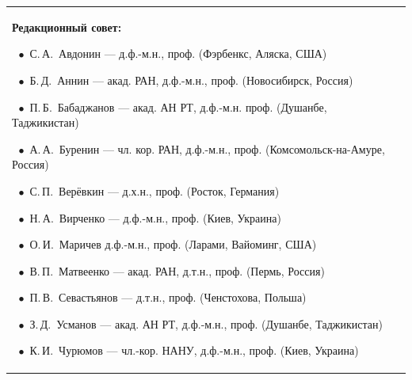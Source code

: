 \begin{table}[t!]
\begin{center}
\begin{tabular}{p{7cm}p{6cm}}
{%


\textbf{Редакционный совет:}
\par 

$~~\bullet$ С.\,А.~Авдонин --- д.ф.-м.н., проф. (Фэрбенкс, Аляска, США)  \par
$~~\bullet$ Б.\,Д.~Аннин --- акад. РАН, д.ф.-м.н., проф. (Новосибирск, Россия)\par
$~~\bullet$ П.\,Б.~Бабаджанов  --- акад. АН РТ, д.ф.-м.н. проф. (Душанбе, Таджикистан) \par
$~~\bullet$ А.\,А.~Буренин --- чл. кор. РАН, д.ф.-м.н., проф. (Комсомольск-на-Амуре, Россия)\par
$~~\bullet$ С.\,П.~Верёвкин  --- д.х.н., проф. (Росток, Германия) \par
$~~\bullet$ Н.\,А.~Вирченко --- д.ф.-м.н., проф. (Киев, Украина) \par
$~~\bullet$ О.\,И.~Маричев  д.ф.-м.н., проф. (Ларами, Вайоминг, США) \par
$~~\bullet$ В.\,П.~Матвеенко --- акад. РАН, д.т.н., проф. (Пермь, Россия) \par
$~~\bullet$ П.\,В.~Севастьянов  --- д.т.н., проф. (Ченстохова, Польша) \par
$~~\bullet$ З.\,Д.~Усманов  --- акад. АН РТ, д.ф.-м.н., проф. (Душанбе, Таджикистан) \par
$~~\bullet$ К.\,И.~Чурюмов --- чл.-кор. НАНУ, д.ф.-м.н., проф. (Киев, Украина)
\smallskip \par


%





}
\end{tabular}
\end{center}
\end{table}
